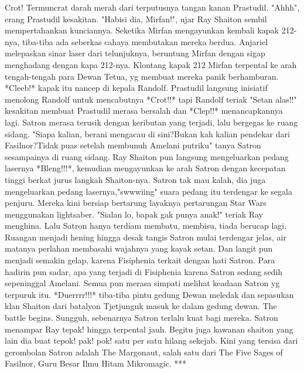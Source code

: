 \documentclass[a4paper,11pt,final]{article}
\begin{document}
Crot! Termuncrat darah merah dari terputusnya tangan kanan Prastudil.
"Ahhh", erang Prastudil kesakitan. "Habisi dia, Mirfan!", ujar Ray Shaiton sembil mempertahankan kunciannya. Seketika Mirfan mengayunkan kembali kapak 212-nya, tiba-tiba ada seberkas cahaya membutakan mereka berdua.
Anjariel melepaskan sinar laser dari telunjuknya, beruntung Mirfan dengan sigap menghadang dengan kapa 212-nya. Klontang kapak 212 Mirfan terpental ke arah tengah-tengah para Dewan Tetua, yg membuat mereka panik berhamburan.
*Cleeb!* kapak itu nancep di kepala Randolf. Prastudil langsung inisiatif menolong Randolf untuk mencabutnya *Crot!!* tapi Randolf teriak "Setan alas!!" kesakitan membuat Prastudil merasa bersalah dan *Clep!!* menancapkannya lagi.
Satron merasa terusik dengan keributan yang terjadi, lalu bergegas ke ruang sidang. "Siapa kalian, berani mengacau di sini?Bukan kah kalian pendekar dari Fasilnor?Tidak puas setelah membunuh Amelani putriku" tanya Satron sesampainya di ruang sidang.
Ray Shaiton pun langsung mengeluarkan pedang lasernya *Bleng!!!*, kemudian mengayunkan ke arah Satron dengan kecepatan tinggi berkat jurus langkah Shaiton-nya.
Satron tak mau kalah, dia juga mengeluarkan pedang lasernya,"swwwiing" suara pedang itu terdengar ke segala penjuru. Mereka kini bersiap bertarung layaknya pertarungan Star Wars menggunakan lightsaber.
"Sialan lo, bapak gak punya anak!" teriak Ray menghina. Lalu Satron hanya terdiam membatu, membisu, tiada berucap lagi. Ruangan menjadi hening hingga desak tangis Satron mulai terdengar jelas, air matanya perlahan membasahi wajahnya yang kayak setan.
Dan langit pun menjadi semakin gelap, karena Fisiphenia terkait dengan hati Satron. Para hadirin pun sadar, apa yang terjadi di Fisiphenia karena Satron sedang sedih sepeninggal Amelani.
Semua pun merasa simpati melihat keadaan Satron yg terpuruk itu. *Duerrrr!!!* tiba-tiba pintu gedung Dewan meledak dan sepasukan klan Shaiton dari batalyon Tjetjunguk masuk ke dalam gedung dewan. The battle begins.
Sungguh, sebenarnya Satron terlalu kuat bagi mereka. Satron menampar Ray tepak! hingga terpental jauh. Begitu juga kawanan shaiton yang lain dia buat tepok! pak! pok! satu per satu hilang sekejab.
Kini yang tersisa dari gerombolan Satron adalah The Margonaut, salah satu dari The Five Sages of Fasilnor, Guru Besar Ilmu Hitam Mikromagic.
***
\end{document}
